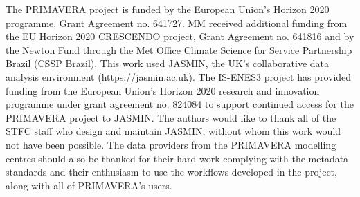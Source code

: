 \documentclass[gmd, manuscript]{copernicus}
\begin{document}


\begin{acknowledgements}
The PRIMAVERA project is funded by the European Union's Horizon 2020 programme, Grant Agreement no. 641727. MM received additional funding from the EU Horizon 2020 CRESCENDO project, Grant Agreement no. 641816 and by the Newton Fund through the Met Office Climate Science for Service Partnership Brazil (CSSP Brazil). This work used JASMIN, the UK's collaborative data analysis environment (https://jasmin.ac.uk). The IS-ENES3 project has provided funding from the European Union’s Horizon 2020 research and innovation programme under grant agreement no. 824084 to support continued access for the PRIMAVERA project to JASMIN. The authors would like to thank all of the STFC staff who design and maintain JASMIN, without whom this work would not have been possible. The data providers from the PRIMAVERA modelling centres should also be thanked for their hard work complying with the metadata standards and their enthusiasm to use the workflows developed in the project, along with all of PRIMAVERA's users.
\end{acknowledgements}



%
%
%





\end{document}
